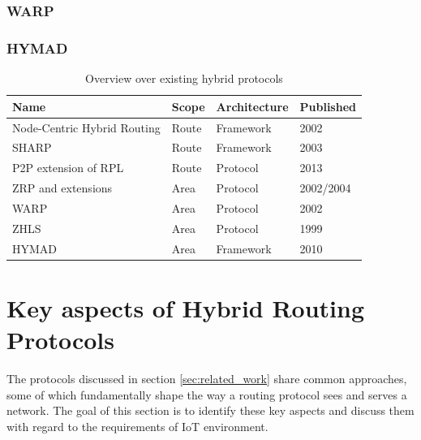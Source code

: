 \documentclass[a4paper,10pt]{scrartcl}
\begin{document}
\subsubsection{\gls{WARP}}
\label{subsec:sharp}

\subsubsection{\gls{HYMAD}}
\label{subsec:sharp}

\begin{table}[t]
    \begin{tabular}{p{}|l|l|l}
        Name & Scope & Architecture & Published \\
        \hline
        Node-Centric Hybrid Routing \cite{Roy_nodecentric} & Route & Framework & 2002 \\
        \gls{SHARP}\cite{SHARP} & Route & Framework & 2003 \\ %
        P2P extension\cite{RFC-6997} of RPL\cite{RFC-6550} & Route & Protocol & 2013\\
        \gls{ZRP} \cite{ZRP-Draft} and extensions \cite{TZRP} \cite{IZR} & Area & Protocol & 2002/2004\\
        \gls{WARP}\cite{WARP} & Area & Protocol & 2002\\
        \gls{ZHLS}\cite{ZHLS} & Area & Protocol & 1999\\
        \gls{HYMAD}\cite{HYMAD} & Area & Framework & 2010\\ %
    \end{tabular}
    \caption{Overview over existing hybrid protocols}
    \label{fig:overview}
\end{table}

\section{Key aspects of Hybrid Routing Protocols}
\label{sec:key_aspects}
The protocols discussed in section \ref{sec:related_work} share common approaches, some of which fundamentally shape the way a routing protocol sees and serves a network. The goal of this section is to identify these key aspects and discuss them with regard to the requirements of IoT environment.
\end{document}
